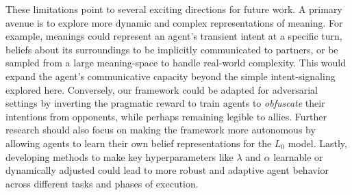\documentclass{article}
\begin{document}
These limitations point to several exciting directions for future work. A primary avenue is to explore more dynamic and complex representations of meaning. For example, meanings could represent an agent's transient intent at a specific turn, beliefs about its surroundings to be implicitly communicated to partners, or be sampled from a large meaning-space to handle real-world complexity. This would expand the agent's communicative capacity beyond the simple intent-signaling explored here. Conversely, our framework could be adapted for adversarial settings by inverting the pragmatic reward to train agents to \textit{obfuscate} their intentions from opponents, while perhaps remaining legible to allies. Further research should also focus on making the framework more autonomous by allowing agents to learn their own belief representations for the $L_0$ model. Lastly, developing methods to make key hyperparameters like $\lambda$ and $\alpha$ learnable or dynamically adjusted could lead to more robust and adaptive agent behavior across different tasks and phases of execution.



\end{document}
